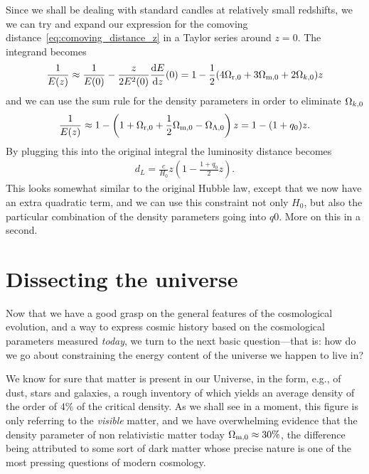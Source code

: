 Since we shall be dealing with standard candles at relatively small redshifts, we
we can try and expand our expression for the comoving distance~\eqref{eq:comoving_distance_z}
in a Taylor series around $z=0$. The integrand becomes
\begin{align*}
  \frac{1}{E(z)} \approx \frac{1}{E(0)} -\frac{z}{2E^2(0)} \dv{E}{z}{(0)} =
  1 - \frac{1}{2} (4\Omega_\text{r,0} + 3\Omega_\text{m,0} + 2 \Omega_{k,0}) z
\end{align*}
and we can use the sum rule for the density parameters in order to eliminate $\Omega_{k,0}$
\begin{align*}
  \frac{1}{E(z)} \approx
  1 - \left(1 + \Omega_\text{r,0} + \frac{1}{2}\Omega_\text{m,0} - \Omega_{\Lambda,0}\right) z =
  1 - (1 + q_0) z.
\end{align*}
By plugging this into the original integral the luminosity distance becomes
\begin{align}
  d_L = \frac{c}{H_0} z \left( 1  - \frac{1 + q_0}{2} z \right).
\end{align}
This looks somewhat similar to the original Hubble law, except that we now have an
extra quadratic term, and we can use this constraint not only $H_0$, but also the
particular combination of the density parameters going into $q0$. More on this in
a second.



\section{Dissecting the universe}

Now that we have a good grasp on the general features of the cosmological evolution,
and a way to express cosmic history based on the cosmological parameters measured
\emph{today}, we turn to the next basic question---that is: how do we go about
constraining the energy content of the universe we happen to live in?

We know for sure that matter is present in our Universe, in the form, e.g., of dust,
stars and galaxies, a rough inventory of which yields an average density of the
order of $4\%$ of the critical density. As we shall see in a moment, this figure is
only referring to the \emph{visible} matter, and we have overwhelming evidence that
the density parameter of non relativistic matter today $\Omega_\text{m,0} \approx 30\%$,
the difference being attributed to some sort of dark matter whose precise nature
is one of the most pressing questions of modern cosmology.

